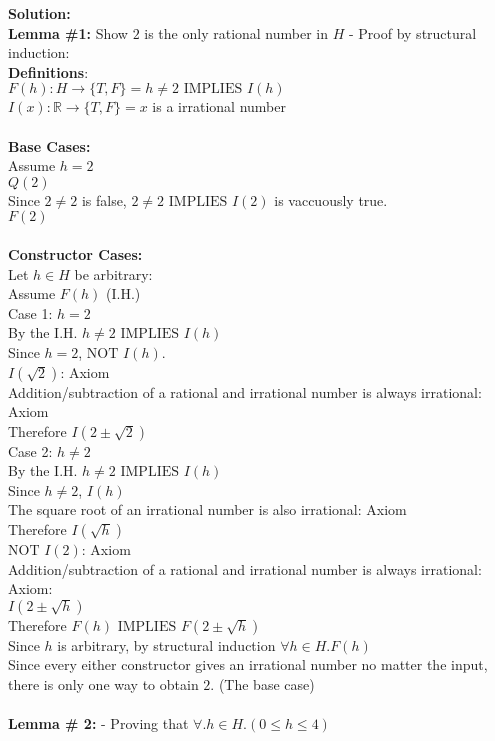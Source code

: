 \documentclass[11pt]{article}
\newcommand{\Implies}{\mbox{ IMPLIES }}
\newcommand{\Not}{\mbox{NOT }}
\begin{document}
\begin{enumerate}
\begin{solution}
{\bf Solution:}\\
{\bf Lemma \#1:} Show $2$ is the only rational number in $H$ - Proof by structural induction:\\
{\bf Definitions}:\\
$F(h): H \rightarrow \{T,F\} = h\ne 2\Implies I(h)$\\
$I(x): \mathbb{R} \rightarrow \{T,F\} = x$ is a irrational number\\\\
{\bf Base Cases: }\\
\null\quad Assume $h=2$\\
\null\quad $Q(2)$\\
\null\quad Since $2\ne2$ is false, $2\ne 2\Implies I(2)$ is vaccuously true.\\
$F(2)$\\\\
{\bf Constructor Cases: }\\
\null\quad Let $h\in H$ be arbitrary:\\
\null\qquad Assume $F(h)$ (I.H.)\\
\null\qquad Case 1: $h = 2$\\
\null\qquad By the I.H. $h\ne 2\Implies I(h)$\\
\null\qquad Since $h=2$, $\Not I(h)$.\\
\null\qquad $I(\sqrt 2)$: Axiom \\
\null\qquad Addition/subtraction of a rational and irrational number is always irrational: Axiom\\
\null\qquad Therefore $I(2\pm\sqrt2)$\\
\null\qquad Case 2: $h\ne2$\\
\null\qquad By the I.H. $h\ne 2\Implies I(h)$\\
\null\qquad Since $h\ne2$, $I(h)$\\
\null\qquad The square root of an irrational number is also irrational: Axiom\\
\null\qquad Therefore $I(\sqrt h)$\\
\null\qquad $\Not I(2)$: Axiom\\
\null\qquad Addition/subtraction of a rational and irrational number is always irrational: Axiom:\\
\null\qquad $I(2\pm\sqrt h)$\\
\null\quad Therefore $F(h)\Implies F(2\pm\sqrt h)$\\
Since $h$ is arbitrary, by structural induction $\forall h\in H.F(h)$\\
Since every either constructor gives an irrational number no matter the input, there is only one way to obtain $2$. (The base case)\\\\
{\bf Lemma \# 2:} - Proving that $\forall.h\in H.(0\le h\le 4)$\\


\end{solution}
\end{enumerate}
\end{document}
